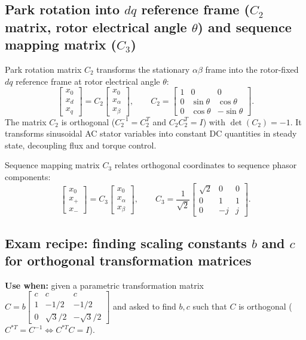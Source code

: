 \subsection{Park rotation into \texorpdfstring{$dq$}{dq} reference frame (\texorpdfstring{$C_2$}{C2} matrix, rotor electrical angle \texorpdfstring{$\theta$}{theta}) and sequence mapping matrix (\texorpdfstring{$C_3$}{C3})}
Park rotation matrix \(C_2\) transforms the stationary \(\alpha\beta\) frame into the rotor-fixed \(dq\) reference frame at rotor electrical angle \(\theta\):
\[
\begin{bmatrix}x_0\\x_d\\x_q\end{bmatrix}
= C_2
\begin{bmatrix}x_0\\x_\alpha\\x_\beta\end{bmatrix},
\qquad
C_2 =
\begin{bmatrix}
1&0&0\\
0&\sin\theta&\cos\theta\\
0&\cos\theta&-\sin\theta
\end{bmatrix}.
\]
The matrix \(C_2\) is orthogonal (\(C_2^{-1} = C_2^T\) and \(C_2 C_2^T = I\)) with \(\det(C_2) = -1\). It transforms sinusoidal AC stator variables into constant DC quantities in steady state, decoupling flux and torque control.

Sequence mapping matrix \(C_3\) relates orthogonal coordinates to sequence phasor components:
\[
\begin{bmatrix}x_0\\x_+\\x_-\end{bmatrix}
= C_3
\begin{bmatrix}x_0\\x_\alpha\\x_\beta\end{bmatrix},
\qquad
C_3 = \frac{1}{\sqrt{2}}
\begin{bmatrix}
\sqrt{2}&0&0\\
0&1&1\\
0&-j&j
\end{bmatrix}.
\]

\subsection{Exam recipe: finding scaling constants \texorpdfstring{$b$}{b} and \texorpdfstring{$c$}{c} for orthogonal transformation matrices}
\textbf{Use when:} given a parametric transformation matrix \(C = b \begin{bmatrix} c & c & c \\ 1 & -1/2 & -1/2 \\ 0 & \sqrt{3}/2 & -\sqrt{3}/2 \end{bmatrix}\) and asked to find \(b, c\) such that \(C\) is orthogonal (\(C^{*T} = C^{-1} \Leftrightarrow C^{*T} C = I\)).

